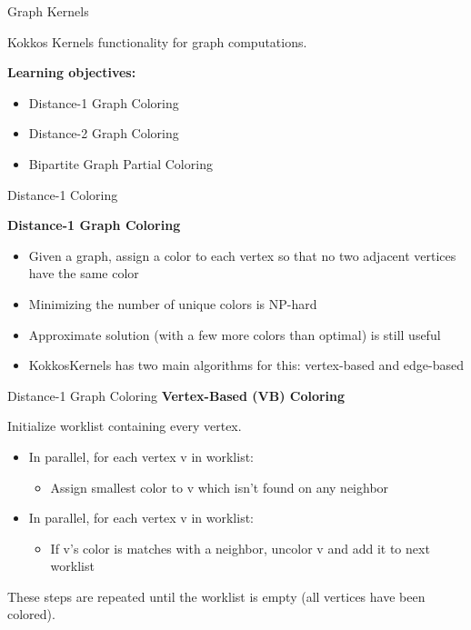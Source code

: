 \begin{frame}[fragile]

  {\Huge Graph Kernels}

  \vspace{10pt}

  {\large Kokkos Kernels functionality for graph computations.}

  \vspace{20pt}

  \textbf{Learning objectives:}
  \begin{itemize}
    \item {Distance-1 Graph Coloring}
    \item {Distance-2 Graph Coloring}
    \item {Bipartite Graph Partial Coloring}
  \end{itemize}

  \vspace{-20pt}

\end{frame}


\begin{frame}[fragile]{Distance-1 Coloring}

\textbf{Distance-1 Graph Coloring}

\begin{itemize}
  \item Given a graph, assign a color to each vertex so that no two adjacent vertices have the same color
  \item Minimizing the number of unique colors is NP-hard
  \item Approximate solution (with a few more colors than optimal) is still useful
  \item KokkosKernels has two main algorithms for this: vertex-based and edge-based
\end{itemize}
\end{frame}

\begin{frame}[fragile]{Distance-1 Graph Coloring}
\textbf{Vertex-Based (VB) Coloring}

Initialize worklist containing every vertex.
\begin{itemize}
  \item In parallel, for each vertex v in worklist:
  \begin{itemize}
    \item Assign smallest color to v which isn't found on any neighbor
  \end{itemize}
  \item In parallel, for each vertex v in worklist:
  \begin{itemize}
    \item If v's color is matches with a neighbor, uncolor v and add it to next worklist
  \end{itemize}
\end{itemize}
These steps are repeated until the worklist is empty (all vertices have been colored).
\end{frame}

